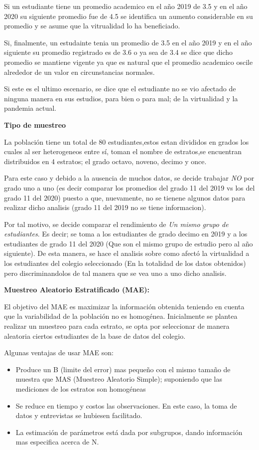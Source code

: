 \documentclass[
]{article}
\providecommand{\tightlist}{%
  \setlength{\itemsep}{0pt}\setlength{\parskip}{0pt}}
\begin{document}
Si un estudiante tiene un promedio academico en el año 2019 de 3.5 y en
el año 2020 su siguiente promedio fue de 4.5 se identifica un aumento
considerable en su promedio y se asume que la vitrualidad lo ha
beneficiado.

Si, finalmente, un estudainte tenia un promedio de 3.5 en el año 2019 y
en el año siguiente su promedio registrado es de 3.6 o ya sea de 3.4 se
dice que dicho promedio se mantiene vigente ya que es natural que el
promedio academico oscile alrededor de un valor en circunstancias
normales.

Si este es el ultimo escenario, se dice que el estudiante no se vio
afectado de ninguna manera en sus estudios, para bien o para mal; de la
virtualidad y la pandemia actual.

\textbf{Tipo de muestreo}

La población tiene un total de 80 estudiantes,estos estan divididos en
grados los cuales al ser heterogeneos entre sí, toman el nombre de
estratos,se encuentran distribuidos en 4 estratos; el grado octavo,
noveno, decimo y once.

Para este caso y debido a la ausencia de muchos datos, se decide
trabajar \emph{NO} por grado uno a uno (es decir comparar los promedios
del grado 11 del 2019 vs los del grado 11 del 2020) puesto a que,
nuevamente, no se tienene algunos datos para realizar dicho analisis
(grado 11 del 2019 no se tiene informacion).

Por tal motivo, se decide comparar el rendimiento de \emph{Un mismo
grupo de estudiantes}. Es decir; se toma a los estudiantes de grado
decimo en 2019 y a los estudiantes de grado 11 del 2020 (Que son el
mismo grupo de estudio pero al año siguiente). De esta manera, se hace
el analisis sobre como afectó la virtualidad a los estudiantes del
colegio seleccionado (En la totalidad de los datos obtenidos) pero
discriminandolos de tal manera que se vea uno a uno dicho analisis.

\textbf{Muestreo Aleatorio Estratificado (MAE):}

El objetivo del MAE es maximizar la información obtenida teniendo en
cuenta que la variabilidad de la población no es homogénea. Inicialmente
se plantea realizar un muestreo para cada estrato, se opta por
seleccionar de manera aleatoria ciertos estudiantes de la base de datos
del colegio.

Algunas ventajas de usar MAE son:

\begin{itemize}
\tightlist
\item
  Produce un B (limite del error) mas pequeño con el mismo tamaño de
  muestra que MAS (Muestreo Aleatorio Simple); suponiendo que las
  mediciones de los estratos son homogéneas
\item
  Se reduce en tiempo y costos las observaciones. En este caso, la toma
  de datos y entrevistas se hubiesen facilitado.
\item
  La estimación de parámetros está dada por subgrupos, dando información
  mas especifica acerca de N.
\end{itemize}
\end{document}
